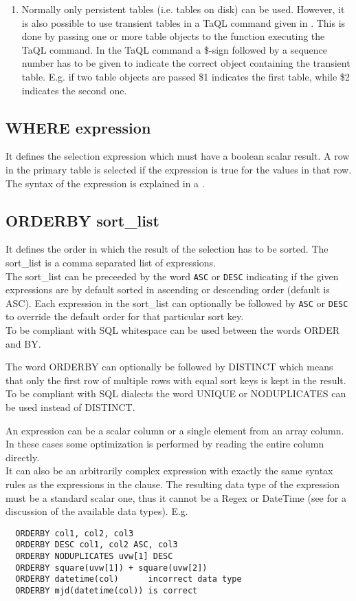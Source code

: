 \begin{enumerate}
\item
Normally only persistent tables (i.e. tables on disk) can
be used. However, it is also possible to use transient tables
in a TaQL command given in
.
This is done by passing one or more table objects to the
function executing the TaQL command. In the TaQL command a
\$-sign followed by a sequence number has to be given to
indicate the correct object containing the transient table.
E.g. if two
table objects are passed \$1 indicates the first table, while \$2
indicates the second one.
\end{enumerate}

\subsection{\label{TAQL:WHERE}WHERE expression}
It defines the selection expression which must have a boolean
scalar result. A row in the primary table
is selected if the expression is true for the values in that row.
The syntax of the expression is explained
in a .

\subsection{\label{TAQL:ORDERBY}ORDERBY sort\_list}
It defines the order in which the result of the selection
has to be sorted. The sort\_list is a comma separated list of
expressions.
\\The sort\_list can be preceeded by the word \texttt{ASC} or
\texttt{DESC} indicating if the given expressions are by
default sorted in ascending or descending order (default is ASC).
Each expression in the sort\_list can optionally be
followed by \texttt{ASC} or \texttt{DESC} to override the
default order for that particular sort key.
\\To be compliant with SQL whitespace can be used between the
words ORDER and BY.

The word ORDERBY can optionally be followed by DISTINCT
which means that only the first row of multiple rows with
equal sort keys is kept in the result. To be compliant with
SQL dialects the word UNIQUE or NODUPLICATES can be used
instead of DISTINCT.

An expression can be a scalar column or a single element from
an array column. In these cases some optimization is performed
by reading the entire column directly.
\\It can also be an arbitrarily complex expression
with exactly the same syntax rules as the expressions in the
 clause.
The resulting data type of the expression must
be a standard scalar one, thus it cannot be a Regex or
DateTime (see  for a discussion
of the available data types).
E.g.
\begin{verbatim}
  ORDERBY col1, col2, col3
  ORDERBY DESC col1, col2 ASC, col3
  ORDERBY NODUPLICATES uvw[1] DESC
  ORDERBY square(uvw[1]) + square(uvw[2])
  ORDERBY datetime(col)      incorrect data type
  ORDERBY mjd(datetime(col)) is correct
\end{verbatim}

